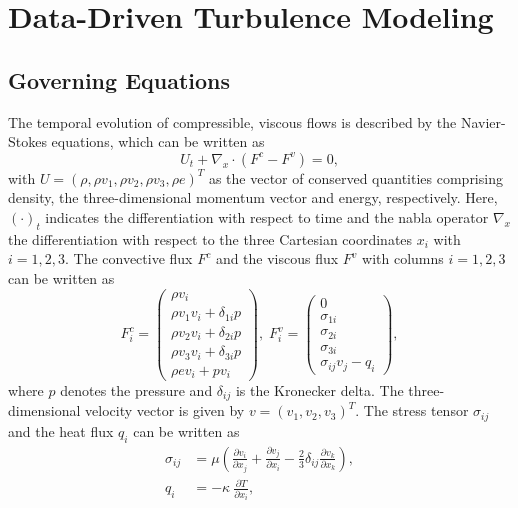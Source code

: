 \section{Data-Driven Turbulence Modeling}
\label{sec:turbulence}


\subsection{Governing Equations}
\label{sec:equations}
The temporal evolution of compressible, viscous flows is described by the Navier-Stokes equations, which can be written as
\begin{equation}
  U_t + \nabla_x\cdot \left(F^c - F^v\right) = 0,
  \label{eq:navier_stokes}
\end{equation}
with $U=\left(\rho, \rho v_1, \rho v_2, \rho v_3, \rho e \right)^T$ as the vector of conserved quantities comprising density, the three-dimensional momentum vector and energy, respectively.
Here, $(\cdot)_t$ indicates the differentiation with respect to time and the nabla operator $\nabla_x$ the differentiation with respect to the three Cartesian coordinates $x_i$ with $i=1,2,3$.
The convective flux $F^c$ and the viscous flux $F^v$ with columns $i=1,2,3$ can be written as 
\begin{equation}
  F_i^c =
  \left(
  \begin{array}{c}
    \rho v_i \\
    \rho v_1 v_i + \delta_{1i} p\\
    \rho v_2 v_i + \delta_{2i} p\\
    \rho v_3 v_i + \delta_{3i} p\\
    \rho e v_i + p v_i
  \end{array}
  \right)
  ,\;
  F_i^v =
  \left(
  \begin{array}{c}
    0 \\
    \sigma_{1i}\\
    \sigma_{2i}\\
    \sigma_{3i}\\
    \sigma_{ij}v_j-q_i
  \end{array}
  \right) ,
  \label{eq:fluxes_written_out}
\end{equation}
where $p$ denotes the pressure and $\delta_{ij}$ is the Kronecker delta.
The three-dimensional velocity vector is given by $v =(v_1,v_2,v_3)^T$.
The stress tensor $\sigma_{ij}$ and the heat flux $q_i$ can be written as
\begin{align}
  \sigma_{ij} &= \mu\left(\frac{\partial v_i}{\partial x_j}+\frac{\partial v_j}{\partial x_i}-\frac{2}{3}\delta_{ij}\frac{\partial v_k}{\partial x_k}\right) ,
  \label{eq:stress_tensor}\\
  q_i &= - \kappa\:\frac{\partial T}{\partial x_i},
  \label{eq:heat_flux}
\end{align}
